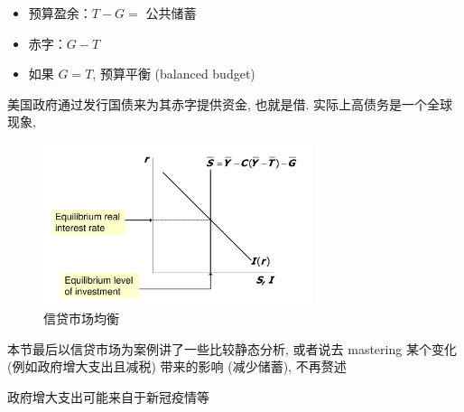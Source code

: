\begin{definition}[预算盈余和赤字]
    \begin{itemize}
        \item 预算盈余：$T - G = $ 公共储蓄
        \item 赤字：$G - T$
        \item 如果 $G = T$, 预算平衡 (balanced budget)
    \end{itemize}
\end{definition}
\begin{note} 美国政府通过发行国债来为其赤字提供资金, 也就是借. 实际上高债务是一个全球现象, \end{note}
\begin{figure}[htbp]
    \centering
    \includegraphics[width=0.7\textwidth]{image/Loanablefundsmarketequilibrium.png}
    \caption{信贷市场均衡}
\end{figure}

\begin{note} 本节最后以信贷市场为案例讲了一些比较静态分析, 或者说去 mastering 某个变化 (例如政府增大支出且减税) 带来的影响 (减少储蓄), 不再赘述 
    
政府增大支出可能来自于新冠疫情等 \end{note}

%
